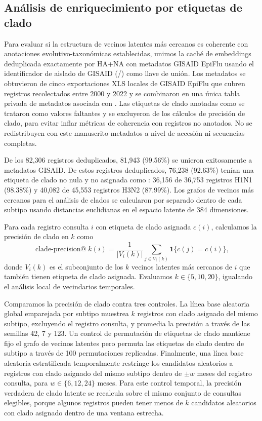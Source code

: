 \documentclass[11pt]{article}
\begin{document}
\subsection{Análisis de enriquecimiento por etiquetas de clado}

Para evaluar si la estructura de vecinos latentes más cercanos es coherente con anotaciones evolutivo-taxonómicas establecidas, unimos la caché de embeddings deduplicada exactamente por HA+NA con metadatos GISAID EpiFlu usando el identificador de aislado de GISAID (/) como llave de unión. Los metadatos se obtuvieron de cinco exportaciones XLS locales de GISAID EpiFlu que cubren registros recolectados entre 2000 y 2022 y se combinaron en una única tabla privada de metadatos asociada con . Las etiquetas de clado anotadas como  se trataron como valores faltantes y se excluyeron de los cálculos de precisión de clado, para evitar inflar métricas de coherencia con registros no anotados. No se redistribuyen con este manuscrito metadatos a nivel de accesión ni secuencias completas.

De los 82,306 registros deduplicados, 81,943 (99.56\%) se unieron exitosamente a metadatos GISAID. De estos registros deduplicados, 76,238 (92.63\%) tenían una etiqueta de clado no nula y no asignada como : 36,156 de 36,753 registros H1N1 (98.38\%) y 40,082 de 45,553 registros H3N2 (87.99\%). Los grafos de vecinos más cercanos para el análisis de clados se calcularon por separado dentro de cada subtipo usando distancias euclidianas en el espacio latente de 384 dimensiones.

Para cada registro consulta $i$ con etiqueta de clado asignada $c(i)$, calculamos la precisión de clado en $k$ como
\[
\operatorname{clade\text{-}precision@}k(i)=
\frac{1}{|V_i(k)|}\sum_{j\in V_i(k)}\mathbf{1}\{c(j)=c(i)\},
\]
donde $V_i(k)$ es el subconjunto de los $k$ vecinos latentes más cercanos de $i$ que también tienen etiqueta de clado asignada. Evaluamos $k\in\{5,10,20\}$, igualando el análisis local de vecindarios temporales.

Comparamos la precisión de clado contra tres controles. La línea base aleatoria global emparejada por subtipo muestrea $k$ registros con clado asignado del mismo subtipo, excluyendo el registro consulta, y promedia la precisión a través de las semillas 42, 7 y 123. Un control de permutación de etiquetas de clado mantiene fijo el grafo de vecinos latentes pero permuta las etiquetas de clado dentro de subtipo a través de 100 permutaciones replicadas. Finalmente, una línea base aleatoria estratificada temporalmente restringe los candidatos aleatorios a registros con clado asignado del mismo subtipo dentro de $\pm w$ meses del registro consulta, para $w\in\{6,12,24\}$ meses. Para este control temporal, la precisión verdadera de clado latente se recalcula sobre el mismo conjunto de consultas elegibles, porque algunos registros pueden tener menos de $k$ candidatos aleatorios con clado asignado dentro de una ventana estrecha.
\end{document}
